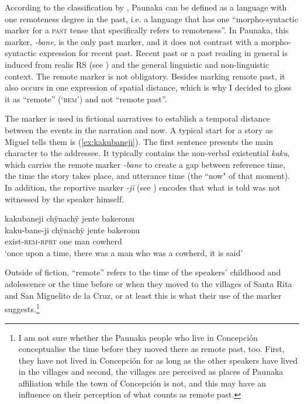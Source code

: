 According to the classification by \citet[47]{Mueller2013}, Paunaka can be defined as a language with one remoteness degree in the past, i.e. a language that has one “morpho-syntactic marker for a \textsc{past} tense that specifically refers to remoteness”. In Paunaka, this marker, \textit{-bane}, is the only past marker, and it does not contrast with a morpho-syntactic expression for recent past. Recent past or a past reading in general is induced from realis RS (see ) and the general linguistic and non-linguistic context. The remote marker is not obligatory. Besides marking remote past, it also occurs in one expression of spatial distance, which is why I decided to gloss it as “remote” (‘\textsc{rem}’) and not “remote past”.

The marker is used in fictional narratives to establish a temporal distance between the events in the narration and now. A typical start for a story as Miguel tells them is (\ref{ex:kakubaneji}). The first sentence presents the main character to the addressee. It typically contains the non-verbal existential  \textit{kaku}, which carries the remote marker \textit{-bane} to create a gap between reference time, the time the story takes place, and utterance time (the “now" of that moment). In addition, the reportive marker \textit{-ji} (see ) encodes that what is told was not witnessed by the speaker himself.

\ea\label{ex:kakubaneji}
\begingl 
\glpreamble kakubaneji chÿnachÿ jente bakeronu\\
\gla kaku-bane-ji chÿnachÿ jente bakeronu\\ 
\glb exist-\textsc{rem}-\textsc{rprt} one man cowherd\\ 
\glft ‘once upon a time, there was a man who was a cowherd, it is said’\\ 
\endgl
\trailingcitation{[mxx-n151017l-1.01]}
\xe

Outside of fiction, “remote” refers to the time of the speakers’ childhood and adolescence or the time before or when they moved to the villages of Santa Rita and San Miguelito de la Cruz, or at least this is what their use of the marker suggests.\footnote{I am not sure whether the Paunaka people who live in Concepción conceptualise the time before they moved there as remote past, too. First, they have not lived in Concepción for as long as the other speakers have lived in the villages and second, the villages are perceived as places of Paunaka affiliation while the town of Concepción is not, and this may have an influence on their perception of what counts as remote past.} 

